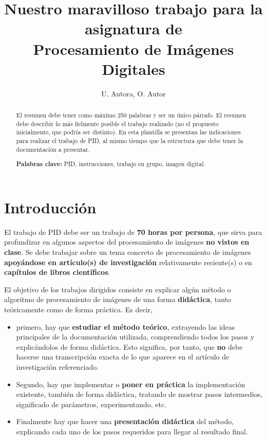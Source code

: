 \documentclass[a4paper]{article}
\title{Nuestro maravilloso trabajo para la asignatura de\\
Procesamiento de Imágenes Digitales}
\author{U. Autora, O. Autor}
\begin{document}
\maketitle

\begin{abstract}
 \noindent El resumen debe tener como máximo 250 palabras y ser un único párrafo. El resumen debe describir lo más fielmente posible el trabajo realizado (no el propuesto inicialmente, que podría ser distinto). 
 En esta plantilla se presentan las indicaciones para realizar el trabajo de PID, al mismo tiempo que la estructura que debe tener la documentación a presentar. 

\hspace{1cm}

\noindent \textbf{Palabras clave:} 
PID, instrucciones, trabajo en grupo, imagen digital.
\end{abstract}


\section{Introducción}

El trabajo de PID debe ser un trabajo de {\bf 70 horas por persona}, que sirva para profundizar en algunos aspectos del procesamiento de imágenes {\bf no vistos en clase}. Se debe trabajar sobre un tema concreto de procesamiento de imágenes {\bf apoyándose en artículo(s) de investigación} relativamente reciente(s) o en {\bf capítulos de libros científicos}.

El objetivo de los trabajos dirigidos consiste en explicar algún método o algoritmo de procesamiento de imágenes de una forma {\bf didáctica}, tanto teóricamente como de forma práctica. Es decir, 
\begin{itemize}
    \item primero, hay que {\bf estudiar el método teórico}, extrayendo las ideas principales de la documentación utilizada, comprendiendo todos los pasos y explicándolos de forma didáctica. Esto significa, por tanto, que {\bf no} debe hacerse una transcripción exacta de lo que aparece en el artículo de investigación referenciado.
    \item Segundo, hay que implementar o {\bf poner en práctica} la implementación existente, también de forma didáctica, tratando de mostrar pasos intermedios, significado de parámetros, experimentando, etc.
    \item Finalmente hay que hacer una {\bf presentación didáctica} del método,  explicando cada uno de los pasos requeridos para llegar al resultado final.

\end{itemize}
\end{document}
